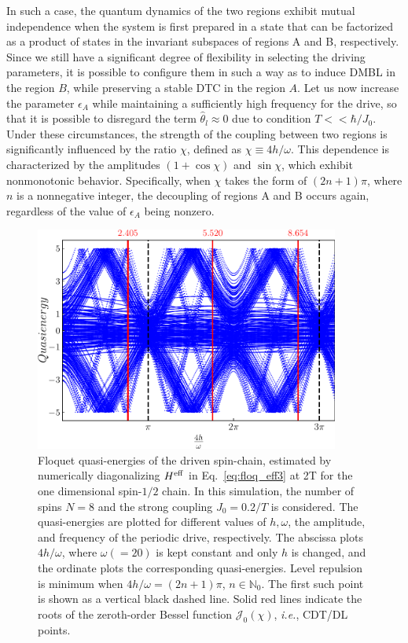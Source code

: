 \documentclass[12pt]{iopart}
\begin{document}
In such a case, the quantum dynamics of the two regions exhibit mutual independence when the system is first prepared in a state that can be factorized as a product of states in the invariant subspaces of regions A and B, respectively. Since we still have a significant degree of flexibility in selecting the driving parameters, it is possible to configure them in such a way as to induce DMBL in the region $B$, while preserving a stable DTC in the region $A$. Let us now increase the parameter $\epsilon_A$ while maintaining a sufficiently high frequency for the drive, so that it is possible to disregard the term $\hat{\theta}_l \approx 0$ due to condition $T<<\hbar/J_0$. Under these circumstances, the strength of the coupling between two regions is significantly influenced by the ratio $\chi$, defined as $\chi\equiv 4h/\omega$. This dependence is characterized by the amplitudes $(1+\cos{\chi})$ and $\sin{\chi}$, which exhibit nonmonotonic behavior. Specifically, when $\chi$ takes the form of $(2n+1)\pi$, where $n$ is a nonnegative integer, the decoupling of regions A and B occurs again, regardless of the value of $\epsilon_A$ being nonzero.
\begin{figure}[h!]
    \centering
    \includegraphics[width=10cm]{quasienergy_8_lowres.pdf}
    \caption{Floquet quasi-energies of the driven spin-chain,  estimated by numerically diagonalizing $H^{\rm eff}$ in Eq.~\eqref{eq:floq_eff3} at 2T for the one dimensional spin-$1/2$ chain. In this simulation, the number of spins $N=8$ and the strong coupling $J_0=0.2/T$ is considered. The quasi-energies are plotted for different values of $h,\omega$, the amplitude, and frequency of the periodic drive, respectively.  The abscissa plots ${4h}/{\omega}$, where $\omega( = 20)$ is kept constant and only $h$ is changed, and the ordinate plots the corresponding quasi-energies. Level repulsion is minimum when ${4h}/{\omega} = (2n+1)\pi$, $n\in \mathbb{N}_0$. The first such point is shown as a vertical black dashed line. Solid red lines indicate the roots of the zeroth-order Bessel function $\mathcal{J}_0(\chi)$, \textit{i.e.}, CDT/DL points.}
    \label{Fig:quasienergy_new}
\end{figure}	
\end{document}

